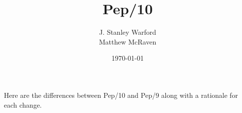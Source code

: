 \documentclass[10pt,fleqn]{book}
\begin{document}
\frontmatter

	\title{\Huge Pep/10}
	\author{J. Stanley Warford\\Matthew McRaven}
	\date{\today}
	\maketitle


\mainmatter
	\pagestyle{fancy}
	\fancyhf{}
	\renewcommand{\headrulewidth}{1pt}
	\renewcommand{\footrulewidth}{0pt}
	\renewcommand{\chaptermark}[1]{\markboth{\sffamily\chaptername{} \thechapter\quad \large\rmfamily\slshape#1}{}}
	\renewcommand{\sectionmark}[1]{\markright{#1}}
	\renewcommand{\headrule}{{\color{brown} \hrule width\headwidth height\headrulewidth \vskip-\headrulewidth}}	

\setcounter{page}{1}
\noindent Here are the differences between Pep/10 and Pep/9 along with a rationale for each change.
\end{document}
